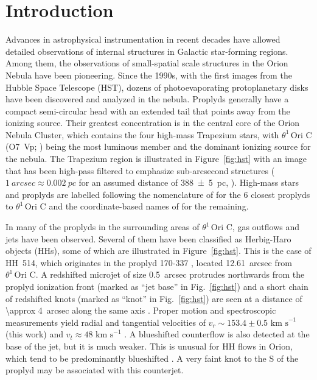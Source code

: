 \documentclass[fleqn,usenatbib]{mnras}
\def\th#1#2{\ensuremath{\theta^{#1}\,\text{Ori~#2}}}
\begin{document}


\section{Introduction}
\label{sec:introduction}

Advances in astrophysical instrumentation in recent decades have allowed detailed observations of internal structures in Galactic star-forming regions. Among them, the observations of small-spatial scale structures in the Orion Nebula have been pioneering. Since the 1990s, with the first images from the Hubble Space Telescope (HST),
dozens of photoevaporating protoplanetary disks \citep[proplyds,][]{Odell1993}
have been discovered and analyzed in the nebula.
Proplyds generally have a compact semi-circular head
with an extended tail that points away from the ionizing source.
Their greatest concentration is in the central core of the Orion Nebula Cluster,
which contains the four high-mass Trapezium stars,
with \th1C{} (O7~Vp; \citealp{Sota:2011a}) being the most luminous member
and the dominant ionizing source for the nebula.
The Trapezium region is illustrated in Figure~\ref{fig:hst}
with an image that has been high-pass filtered to emphasize sub-arcsecond structures
(\(\SI{1}{arcsec} \approx \SI{0.002}{pc}\) for an assumed distance of \SI{388 \pm 5}{pc},
\citealp{Kounkel:2017a}).
High-mass stars and proplyds are labelled following the nomenclature
of \citet{Laques:1979a} for the 6 closest proplyds to \th1C{}
and the coordinate-based names of \citet{Odell:1994a} for the remaining.

In many of the proplyds in the surrounding areas of \th1C, gas outflows and jets have been observed. Several of them have been classified as Herbig-Haro objects (HHs),
some of which are illustrated in Figure~\ref{fig:hst}.
This is the case of HH~514, which originates in the proplyd 170-337 \citep[][]{Bally:1998a},
located \SI{12.61}{arcsec} from \th1C.
A redshifted microjet of size \SI{0.5}{arcsec} protrudes northwards from the proplyd
ionization front
(marked as ``jet base'' in Fig.~\ref{fig:hst})
and a short chain of redshifted knots
(marked as ``knot'' in Fig.~\ref{fig:hst})
are seen at a distance of \SI{\approx 4}{arcsec}
along the same axis
\citep{bally00, odellyhenney08}.
Proper motion and spectroscopic measurements yield
radial and tangential velocities of
$v_{r} \sim 153.4 \pm 0.5  \text{ km s}^{-1}$ (this work)
and $ v_{t} \approx 48 \text{ km s}^{-1}$ .
A blueshifted counterflow is also detected at the base of the jet,
but it is much weaker.
This is unusual for HH flows in Orion,
which tend to be predominantly blueshifted \citep[][]{Henney:2007b}.
A very faint knot to the S of the proplyd may be associated with this counterjet.
\end{document}
